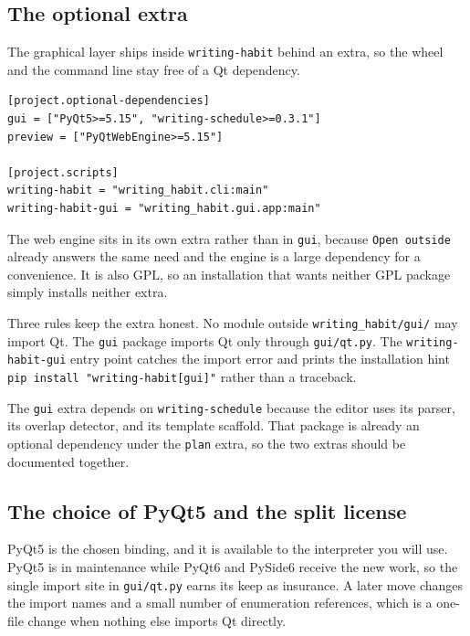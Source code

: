 \documentclass[11pt]{article}
\begin{document}
\subsection{The optional extra}
\label{sec:org695e99f}

The graphical layer ships inside \texttt{writing-habit} behind an extra, so the wheel
and the command line stay free of a Qt dependency.

\begin{verbatim}
[project.optional-dependencies]
gui = ["PyQt5>=5.15", "writing-schedule>=0.3.1"]
preview = ["PyQtWebEngine>=5.15"]

[project.scripts]
writing-habit = "writing_habit.cli:main"
writing-habit-gui = "writing_habit.gui.app:main"
\end{verbatim}

The web engine sits in its own extra rather than in \texttt{gui}, because \texttt{Open
outside} already answers the same need and the engine is a large dependency for
a convenience. It is also GPL, so an installation that wants neither GPL package
simply installs neither extra.

Three rules keep the extra honest. No module outside \texttt{writing\_habit/gui/} may
import Qt. The \texttt{gui} package imports Qt only through \texttt{gui/qt.py}. The
\texttt{writing-habit-gui} entry point catches the import error and prints the
installation hint \texttt{pip install "writing-habit[gui]"} rather than a traceback.

The \texttt{gui} extra depends on \texttt{writing-schedule} because the editor uses its parser,
its overlap detector, and its template scaffold. That package is already an
optional dependency under the \texttt{plan} extra, so the two extras should be
documented together.
\subsection{The choice of PyQt5 and the split license}
\label{sec:orgc71b6ec}

PyQt5 is the chosen binding, and it is available to the interpreter you will
use. PyQt5 is in maintenance while PyQt6 and PySide6 receive the new work, so
the single import site in \texttt{gui/qt.py} earns its keep as insurance. A later move
changes the import names and a small number of enumeration references, which is
a one-file change when nothing else imports Qt directly.
\end{document}
